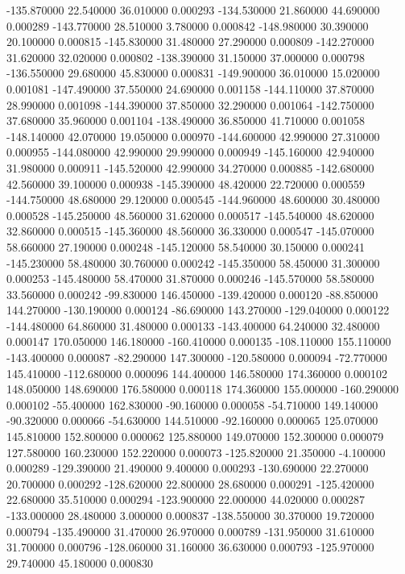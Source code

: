 -135.870000 22.540000 36.010000 0.000293 
-134.530000 21.860000 44.690000 0.000289 
-143.770000 28.510000 3.780000 0.000842 
-148.980000 30.390000 20.100000 0.000815 
-145.830000 31.480000 27.290000 0.000809 
-142.270000 31.620000 32.020000 0.000802 
-138.390000 31.150000 37.000000 0.000798 
-136.550000 29.680000 45.830000 0.000831 
-149.900000 36.010000 15.020000 0.001081 
-147.490000 37.550000 24.690000 0.001158 
-144.110000 37.870000 28.990000 0.001098 
-144.390000 37.850000 32.290000 0.001064 
-142.750000 37.680000 35.960000 0.001104 
-138.490000 36.850000 41.710000 0.001058 
-148.140000 42.070000 19.050000 0.000970 
-144.600000 42.990000 27.310000 0.000955 
-144.080000 42.990000 29.990000 0.000949 
-145.160000 42.940000 31.980000 0.000911 
-145.520000 42.990000 34.270000 0.000885 
-142.680000 42.560000 39.100000 0.000938 
-145.390000 48.420000 22.720000 0.000559 
-144.750000 48.680000 29.120000 0.000545 
-144.960000 48.600000 30.480000 0.000528 
-145.250000 48.560000 31.620000 0.000517 
-145.540000 48.620000 32.860000 0.000515 
-145.360000 48.560000 36.330000 0.000547 
-145.070000 58.660000 27.190000 0.000248 
-145.120000 58.540000 30.150000 0.000241 
-145.230000 58.480000 30.760000 0.000242 
-145.350000 58.450000 31.300000 0.000253 
-145.480000 58.470000 31.870000 0.000246 
-145.570000 58.580000 33.560000 0.000242 
-99.830000 146.450000 -139.420000 0.000120 
-88.850000 144.270000 -130.190000 0.000124 
-86.690000 143.270000 -129.040000 0.000122 
-144.480000 64.860000 31.480000 0.000133 
-143.400000 64.240000 32.480000 0.000147 
170.050000 146.180000 -160.410000 0.000135 
-108.110000 155.110000 -143.400000 0.000087 
-82.290000 147.300000 -120.580000 0.000094 
-72.770000 145.410000 -112.680000 0.000096 
144.400000 146.580000 174.360000 0.000102 
148.050000 148.690000 176.580000 0.000118 
174.360000 155.000000 -160.290000 0.000102 
-55.400000 162.830000 -90.160000 0.000058 
-54.710000 149.140000 -90.320000 0.000066 
-54.630000 144.510000 -92.160000 0.000065 
125.070000 145.810000 152.800000 0.000062 
125.880000 149.070000 152.300000 0.000079 
127.580000 160.230000 152.220000 0.000073 
-125.820000 21.350000 -4.100000 0.000289 
-129.390000 21.490000 9.400000 0.000293 
-130.690000 22.270000 20.700000 0.000292 
-128.620000 22.800000 28.680000 0.000291 
-125.420000 22.680000 35.510000 0.000294 
-123.900000 22.000000 44.020000 0.000287 
-133.000000 28.480000 3.000000 0.000837 
-138.550000 30.370000 19.720000 0.000794 
-135.490000 31.470000 26.970000 0.000789 
-131.950000 31.610000 31.700000 0.000796 
-128.060000 31.160000 36.630000 0.000793 
-125.970000 29.740000 45.180000 0.000830 
